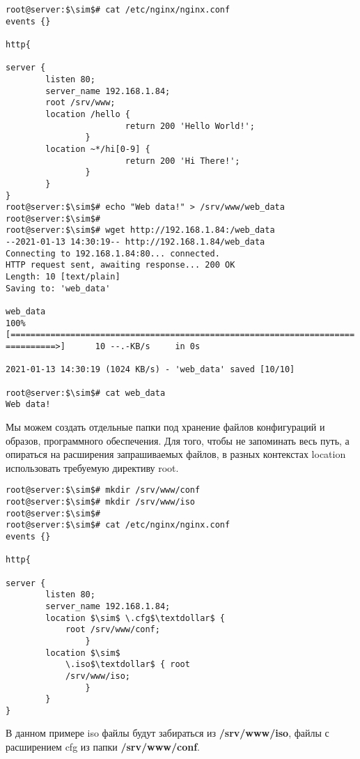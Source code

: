\documentclass[14pt, a4paper]{article}
\begin{document}
\vspace{0.3cm}
\begin{lstlisting}
root@server:$\sim$# cat /etc/nginx/nginx.conf
events {}

http{ 
    
server {
        listen 80;
        server_name 192.168.1.84;
        root /srv/www;
        location /hello {
                        return 200 'Hello World!';
                }
        location ~*/hi[0-9] {
                        return 200 'Hi There!';
                }
        }
}
root@server:$\sim$# echo "Web data!" > /srv/www/web_data
root@server:$\sim$#
root@server:$\sim$# wget http://192.168.1.84:/web_data
--2021-01-13 14:30:19-- http://192.168.1.84/web_data
Connecting to 192.168.1.84:80... connected.
HTTP request sent, awaiting response... 200 OK
Length: 10 [text/plain]
Saving to: 'web_data'

web_data
100%[=====================================================================
==========>]      10 --.-KB/s     in 0s

2021-01-13 14:30:19 (1024 KB/s) - 'web_data' saved [10/10]

root@server:$\sim$# cat web_data
Web data!
\end{lstlisting}
\newpage

Мы можем создать отдельные папки под хранение файлов конфигураций и образов, программного
обеспечения. Для того, чтобы не запоминать весь путь, а опираться на расширения запрашиваемых
файлов, в разных контекстах \colorbox{backcolour}{location} использовать требуемую директиву \colorbox{backcolour}{root}.

\vspace{0.3cm}
\begin{lstlisting}
root@server:$\sim$# mkdir /srv/www/conf
root@server:$\sim$# mkdir /srv/www/iso
root@server:$\sim$#
root@server:$\sim$# cat /etc/nginx/nginx.conf
events {}

http{ 
    
server {
        listen 80;
        server_name 192.168.1.84;
        location $\sim$ \.cfg$\textdollar$ {
            root /srv/www/conf;
                }
        location $\sim$
            \.iso$\textdollar$ { root
            /srv/www/iso;
                }
        }
}
\end{lstlisting}
\vspace{0.2cm}

В данном примере iso файлы будут забираться из \textbf{/srv/www/iso}, файлы с расширением cfg из папки
\textbf{/srv/www/conf}.
\end{document}
